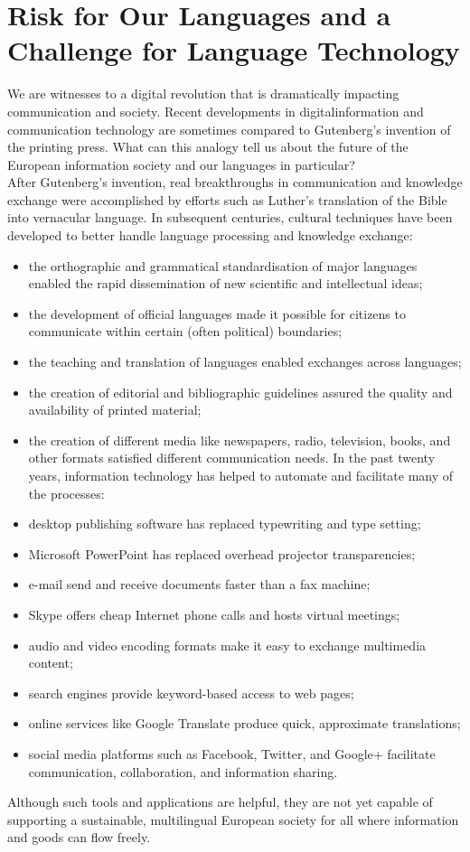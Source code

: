\documentclass[]{../metanetpaper}
\begin{document}
	\section{Risk for Our Languages and a Challenge for Language Technology}

We are witnesses to a digital revolution that is dramatically impacting communication and society.
Recent developments in digitalinformation and communication technology are sometimes compared to Gutenberg’s invention of the printing press. What can this analogy tell us about the future of the European information society and our languages in particular?\\
After Gutenberg’s invention, real breakthroughs in communication and knowledge exchange were accomplished by efforts such as Luther’s translation of the Bible into vernacular language. In subsequent centuries, cultural techniques have been developed to better handle language processing and knowledge exchange:
\begin{itemize}
\item the orthographic and grammatical standardisation of major languages enabled the rapid dissemination of new scientific and intellectual ideas;
\item the development of official languages made it possible for citizens to communicate within certain (often political) boundaries;
\item the teaching and translation of languages enabled exchanges across languages;
\item the creation of editorial and bibliographic guidelines assured the quality and availability of printed material;
\item the creation of different media like newspapers, radio, television, books, and other formats satisfied different communication needs. In the past twenty years, information technology has helped to automate and facilitate many of the processes:
\item desktop publishing software has replaced typewriting and type setting;
\item Microsoft PowerPoint has replaced overhead projector transparencies;
\item e-mail send and receive documents faster than a fax machine;
\item Skype offers cheap Internet phone calls and hosts virtual meetings;
\item audio and video encoding formats make it easy to exchange multimedia content;
\item search engines provide keyword-based access to web pages;
\item online services like Google Translate produce quick, approximate translations;
\item social media platforms such as Facebook, Twitter, and Google+ facilitate communication, collaboration, and information sharing.
\end{itemize}
Although such tools and applications are helpful, they are not yet capable of supporting a sustainable, multilingual European society for all where information and goods can flow freely.
	
\end{document}
